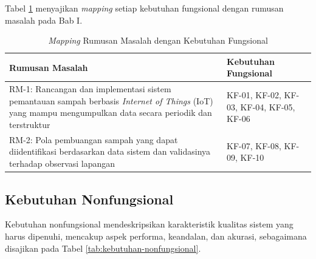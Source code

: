 Tabel \ref{tab:mapping-rm-kf} menyajikan \textit{mapping} setiap kebutuhan fungsional dengan rumusan masalah pada Bab I.

\begin{table}[H]
  \caption{\textit{Mapping} Rumusan Masalah dengan Kebutuhan Fungsional}
  \label{tab:mapping-rm-kf}
  \begin{tabularx}{\textwidth}{| X | l |}
    \hline
    \textbf{Rumusan Masalah} & \textbf{Kebutuhan Fungsional} \\
    \hline
    RM-1: Rancangan dan implementasi sistem pemantauan sampah berbasis \textit{Internet of Things} (IoT) yang mampu mengumpulkan data secara periodik dan terstruktur & KF-01, KF-02, KF-03, KF-04, KF-05, KF-06 \\
    \hline
    RM-2: Pola pembuangan sampah yang dapat diidentifikasi berdasarkan data sistem dan validasinya terhadap observasi lapangan & KF-07, KF-08, KF-09, KF-10 \\
    \hline
  \end{tabularx}
\end{table}

\subsection{Kebutuhan Nonfungsional}

Kebutuhan nonfungsional mendeskripsikan karakteristik kualitas sistem yang harus dipenuhi, mencakup aspek performa, keandalan, dan akurasi, sebagaimana disajikan pada Tabel \ref{tab:kebutuhan-nonfungsional}.

